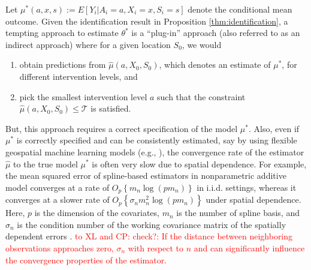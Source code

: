 \documentclass[12pt]{article}
\newcommand{\CP}[1]{{\color{purple}From Chan: #1}}
\begin{document}
Let $\mu^*(a,x,s):=E[Y_i|A_i=a, X_i = x, S_i = s]$ denote the conditional mean outcome. Given the identification result in Proposition  \ref{thm:identification}, a tempting approach to estimate $\theta^*$ is a ``plug-in'' approach (also referred to as an indirect approach) where for a given location $S_0$, we would
\begin{enumerate}
\item[(i)] obtain predictions from $\widehat{\mu}(a,X_0, S_0)$, which denotes an estimate of $\mu^*$, for different intervention levels, and
\item[(ii)] pick the smallest intervention level $a$ such that the constraint $\widehat{\mu}(a,X_0, S_0) \leq \mathcal{T}$ is satisfied.
\end{enumerate}
But, this approach requires a correct specification of the model $\mu^*$. Also, even if $\mu^*$ is correctly specified and can be consistently estimated, say by using flexible geospatial machine learning models (e.g.,  \citet{nandy2017additive,sigrist2022gaussian,saha2023random,zhan2024neural}),
the convergence rate of the estimator $\widehat{\mu}$ to the true model $\mu^*$ is often very slow due to spatial dependence. For example, the mean squared error of spline-based estimators in nonparametric additive model converges at a rate of $O_p\left\{m_n\log(pm_n)\right\}$ in i.i.d. settings, whereas it converges at a slower rate of $O_p\left\{\sigma_nm_n^2\log(pm_n)\right\}$ under spatial dependence. Here, $p$ is the dimension of the covariates, $m_n$ is the number of spline basis, and $\sigma_n$ is the condition number of the working covariance matrix of the spatially dependent errors \citep{nandy2017additive}. \textcolor{red}{to XL and CP: check?: If the distance between neighboring observations approaches zero, $\sigma_n$ with respect to $n$ and can significantly influence the convergence properties of the estimator.}
\end{document}
